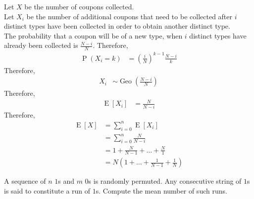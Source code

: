 \documentclass[titlepage, fleqn, a4paper, 12pt, twoside]{article}
\theoremstyle{definition}
\theoremstyle{theorem}
\DeclareMathOperator{\prob}{\mathrm{P}}
\DeclareMathOperator{\expct}{\mathrm{E}}
\DeclareMathOperator{\geo}{\mathrm{Geo}}
\begin{document}
\begin{solution}
	Let $X$ be the number of coupons collected.\\
	Let $X_i$ be the number of additional coupons that need to be collected after $i$ distinct types have been collected in order to obtain another distinct type.\\
	The probability that a coupon will be of a new type, when $i$ distinct types have already been collected is $\frac{N - i}{N}$.
	Therefore,
	\begin{align*}
		\prob(X_i = k) & = \left( \frac{i}{N} \right)^{k - 1} \frac{N - i}{k}
	\end{align*}
	Therefore,
	\begin{align*}
		X_i & \sim \geo\left( \frac{N - i}{N} \right)
	\end{align*}
	Therefore,
	\begin{align*}
		\expct[X_i] & = \frac{N}{N - i}
	\end{align*}
	Therefore,
	\begin{align*}
		\expct[X] & = \sum\limits_{i = 0}^{n} \expct[X_i]       \\
                          & = \sum\limits_{i = 0}^{n} \frac{N}{N - i}   \\
                          & = 1 + \frac{N}{N - 1} + \dots + \frac{N}{1} \\
                          & = N \left( 1 + \dots + \frac{1}{N - 1} + \frac{1}{N} \right)
	\end{align*}
\end{solution}

\begin{question}
	A sequence of $n$ $1$s and $m$ $0$s is randomly permuted.
	Any consecutive string of $1$s is said to constitute a run of $1$s.
	Compute the mean number of such runs.
\end{question}
\end{document}
